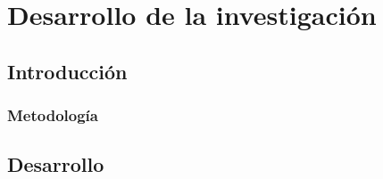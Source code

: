 \chapter{Desarrollo de la investigaci\'{o}n}
\label{sec:chapter4}

\section{Introducci\'{o}n}




\subsection{Metodolog\'ia}




\section{Desarrollo}


